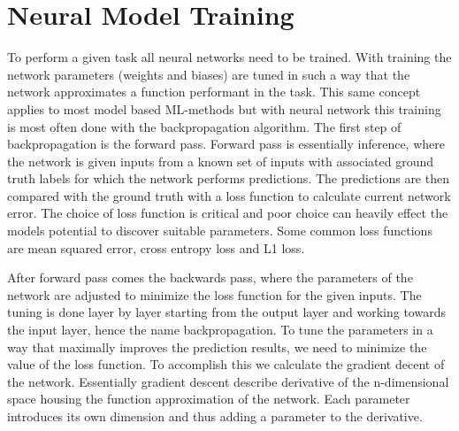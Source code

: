 \documentclass[12pt,a4paper,english
]{tunithesis}
\begin{document}
\section{Neural Model Training}
To perform a given task all neural networks need to be trained. With training the network parameters (weights and biases) are tuned in such a way that the network approximates a function performant in the task. This same concept applies to most model based ML-methods but with neural network this training is most often done with the backpropagation algorithm. The first step of backpropagation is the forward pass. Forward pass is essentially inference, where the network is given inputs from a known set of inputs with associated ground truth labels for which the network performs predictions. The predictions are then compared with the ground truth with a loss function to calculate current network error. The choice of loss function is critical and poor choice can heavily effect the models potential to discover suitable parameters. Some common loss functions are mean squared error, cross entropy loss and L1 loss.

After forward pass comes the backwards pass, where the parameters of the network are adjusted to minimize the loss function for the given inputs. The tuning is done layer by layer starting from the output layer and working towards the input layer, hence the name backpropagation. To tune the parameters in a way that maximally improves the prediction results, we need to minimize the value of the loss function. To accomplish this we calculate the gradient decent of the network. Essentially gradient descent describe derivative of the n-dimensional space housing the function approximation of the network. Each parameter introduces its own dimension and thus adding a parameter to the derivative.
\end{document}
